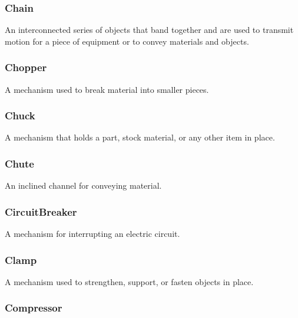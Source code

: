 \FloatBarrier

\subsubsection{Chain}
  \label{sec:Chain}


An interconnected series of objects that band together and are used to transmit motion for a piece of equipment or to convey materials and objects.

\FloatBarrier

\subsubsection{Chopper}
  \label{sec:Chopper}


A mechanism used to break material into smaller pieces.

\FloatBarrier

\subsubsection{Chuck}
  \label{sec:Chuck}


A mechanism that holds a part, stock material, or any other item in place.

\FloatBarrier

\subsubsection{Chute}
  \label{sec:Chute}


An inclined channel for conveying material.

\FloatBarrier

\subsubsection{CircuitBreaker}
  \label{sec:CircuitBreaker}


A mechanism for interrupting an electric circuit.

\FloatBarrier

\subsubsection{Clamp}
  \label{sec:Clamp}


A mechanism used to strengthen, support, or fasten objects in place.

\FloatBarrier

\subsubsection{Compressor}
  \label{sec:Compressor}


